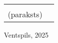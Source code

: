 \begin{titlepage}
\begin{center}
\begin{tabular}{@{}r@{}l@{}}
{%

\mbox{}\hrulefill\vspace{-0.4em}\\
{\scriptsize(paraksts)}\vspace{1.2em}} \\
\end{tabular}
\vfill
Ventspils, 2025
\end{center}
\end{titlepage}